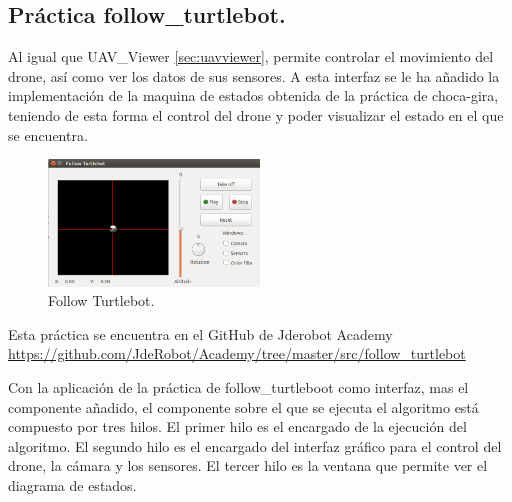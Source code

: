 \subsection{Pr\'actica follow\_turtlebot.}
\label{sec.JdeRobotAcademyFT}
\hspace{1 cm} Al igual que UAV\_Viewer \ref{sec:uavviewer}, permite controlar el movimiento del drone, as\'i como ver los datos de sus sensores. A esta interfaz se le ha añadido la implementaci\'on de la maquina de estados obtenida de la pr\'actica de choca-gira, teniendo de esta forma el control del drone y poder visualizar el estado en el que se encuentra.


 \begin{figure}[H]
	\centering
		\includegraphics[width=0.5\textwidth]{imgs/follow_turtlebot.png}
		\caption{Follow Turtlebot.}
	\label{fig:FollowTurtlebot}
\end{figure}

\hspace{1 cm}Esta pr\'actica se encuentra en el GitHub de Jderobot Academy \url{https://github.com/JdeRobot/Academy/tree/master/src/follow_turtlebot}

\hspace{1 cm}Con la aplicaci\'on de la pr\'actica de follow\_turtleboot como interfaz, mas el componente añadido, el componente sobre el que se ejecuta el algoritmo est\'a compuesto por tres hilos. El primer hilo es el encargado de la ejecuci\'on del algoritmo. El segundo hilo es el encargado del interfaz gr\'afico para el control del drone, la c\'amara y los sensores. El tercer hilo es la ventana que permite ver el diagrama de estados. 


